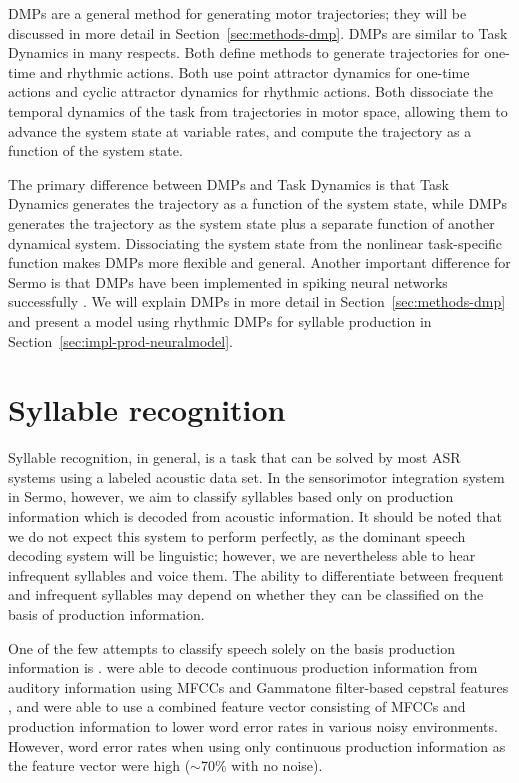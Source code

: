 DMPs are a general method for generating motor trajectories;
they will be discussed in more detail
in Section~\ref{sec:methods-dmp}.
DMPs are similar to Task Dynamics in many respects.
Both define methods to generate trajectories
for one-time and rhythmic actions.
Both use point attractor dynamics
for one-time actions
and cyclic attractor dynamics
for rhythmic actions.
Both dissociate the temporal dynamics
of the task from trajectories
in motor space,
allowing them to advance the system state
at variable rates,
and compute the trajectory
as a function of the system state.

The primary difference between DMPs and Task Dynamics
is that Task Dynamics generates
the trajectory as a function
of the system state,
while DMPs generates the trajectory
as the system state
plus a separate function
of another dynamical system.
Dissociating the system state
from the nonlinear task-specific function
makes DMPs more flexible and general.
Another important difference for Sermo
is that DMPs have been implemented
in spiking neural networks successfully
\citep{dewolf2015}.
We will explain DMPs in more detail
in Section~\ref{sec:methods-dmp} and present a model
using rhythmic DMPs for syllable production
in Section~\ref{sec:impl-prod-neuralmodel}.

\section{Syllable recognition}

Syllable recognition, in general,
is a task that can be solved
by most ASR systems
using a labeled acoustic data set.
In the sensorimotor integration system
in Sermo, however,
we aim to classify syllables
based only on production information
which is decoded from acoustic information.
It should be noted that we do not expect
this system to perform perfectly,
as the dominant speech decoding system
will be linguistic;
however, we are nevertheless able
to hear infrequent syllables
and voice them.
The ability to differentiate
between frequent and infrequent syllables
may depend on whether they
can be classified
on the basis of production information.

One of the few attempts to classify speech
solely on the basis production information
is \citet{mitra2014}.
\citeauthor{mitra2014} were able to
decode continuous production information
from auditory information
using MFCCs and Gammatone filter-based
cepstral features \citep{mitra2012},
and were able to use a combined feature vector
consisting of MFCCs and production information
to lower word error rates
in various noisy environments.
However, word error rates
when using only continuous production information
as the feature vector
were high ($\sim$70\% with no noise).

